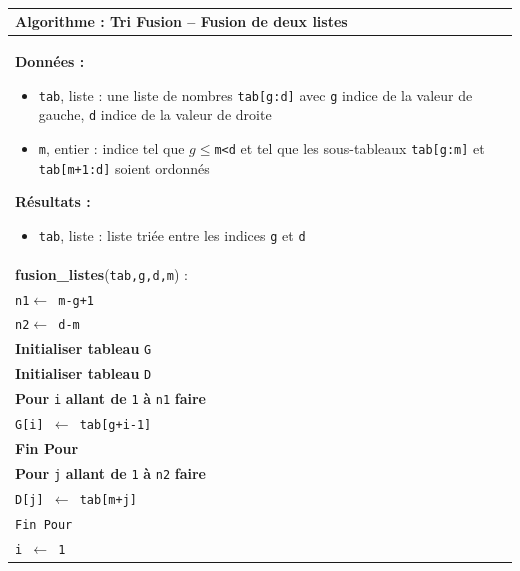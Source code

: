 \documentclass[10pt,fleqn]{article} %
\newcommand{\tsf}[1]{\small{\texttt{#1}}}
\begin{document}
\begin{minipage}[c]{.48\linewidth}
\begin{pseudo}
~\\
\begin{tabular}{p{}}
\hline
\textbf{Algorithme :} Tri Fusion -- Fusion de deux listes\\
\hline
\textbf{Données :}
\begin{itemize}
\item \tsf{tab}, liste : une liste de nombres \tsf{tab[g:d]} avec \tsf{g} indice de la valeur de gauche, \tsf{d} indice de la valeur de droite
\item \tsf{m}, entier : indice tel que \tsf{$g\leq$m<d} et tel que les sous-tableaux \tsf{tab[g:m]} et \tsf{tab[m+1:d]} soient ordonnés
\end{itemize}
\textbf{Résultats :} 
\begin{itemize}
\item \tsf{tab}, liste : liste triée entre les indices \tsf{g} et \tsf{d}
\end{itemize}
\\
\textbf{fusion\_listes}(\tsf{tab,g,d,m}) :\\
\hspace{.4cm} \tsf{n1$\leftarrow$ m-g+1}\\
\hspace{.4cm} \tsf{n2$\leftarrow$ d-m}\\
\hspace{.4cm} \textbf{Initialiser tableau} \tsf{G}  \\
\hspace{.4cm} \textbf{Initialiser tableau} \tsf{D}  \\
\hspace{.4cm} \textbf{Pour} \tsf{i} \textbf{allant de} \tsf{1} \textbf{à} \tsf{n1} \textbf{faire}\\
\hspace{.8cm} \tsf{G[i] $ \leftarrow$ tab[g+i-1]}\\
\hspace{.4cm} \textbf{Fin Pour}\\
\hspace{.4cm} \textbf{Pour} \tsf{j} \textbf{allant de} \tsf{1} \textbf{à} \tsf{n2} \textbf{faire}\\
\hspace{.8cm} \tsf{D[j] $ \leftarrow$ tab[m+j]}\\
\hspace{.4cm} \tsf{Fin Pour}\\
\hspace{.4cm} \tsf{i $\leftarrow$ 1}\\

\end{tabular}
\end{pseudo}
\end{minipage}
\end{document}
